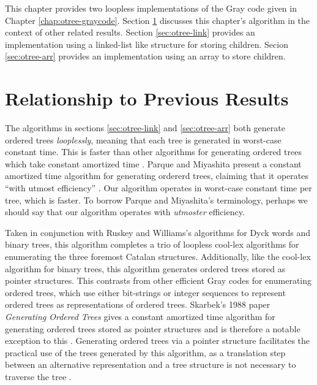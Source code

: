 This chapter provides two loopless implementations of the Gray code given in Chapter \ref{chap:otree-graycode}.  
Section \ref{sec:relationship-loopless} discusses this chapter's algorithm in the context of other related results.  Section \ref{sec:otree-link} provides an implementation using a linked-list like structure for storing children.  Secion \ref{sec:otree-arr} provides an implementation using an array to store children.  


\section{Relationship to Previous Results}\label{sec:relationship-loopless}
The algorithms in sections \ref{sec:otree-link} and \ref{sec:otree-arr} both generate ordered trees \emph{looplessly}, meaning that each tree is generated in worst-case constant time.  This is faster than other algorithms for generating ordered trees which take constant amortized time \cite{parque2021efficient} \cite{er1985lexotrees} \cite{zaks1980lexotrees} \cite{skarbek1988pointerotrees}. Parque and Miyashita present a constant amortized time algorithm for generating ordererd trees, claiming that it operates ``with utmost efficiency'' \cite{parque2021efficient}.  Our algorithm operates in worst-case constant time per tree, which is faster. To borrow Parque and Miyashita's terminology, perhaps we should say that our algorithm operates with \emph{utmoster} efficiency. 

Taken in conjunction with Ruskey and Williams's algorithms for Dyck words and binary trees, this algorithm completes a trio of loopless cool-lex algorithms for enumerating the three foremost Catalan structures.  
Additionally, like the cool-lex algorithm for binary trees, this algorithm generates ordered trees stored as pointer structures.  This contrasts from other efficient Gray codes for enumerating ordered trees, which use either bit-strings or integer sequences to represent ordered trees \cite{parque2021efficient} \cite{zaks1980lexotrees} \cite{er1985lexotrees} as representations of ordered trees.  Skarbek's 1988 paper \emph{Generating Ordered Trees} gives a constant amortized time algorithm for generating ordered trees stored as pointer structures and is therefore a notable exception to this \cite{skarbek1988pointerotrees}.
Generating ordered trees via a pointer structure facilitates the practical %
use of the trees generated by this algorithm, as a translation step between an alternative representation and a tree structure is not necessary to traverse the tree .


